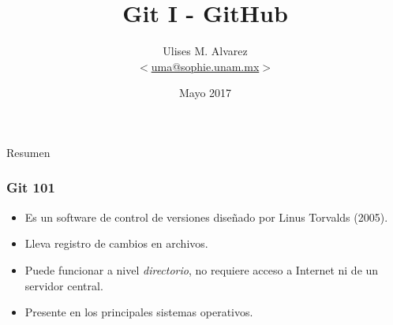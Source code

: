 \documentclass{beamer}
\title{Git I - GitHub}
\date{Mayo 2017}
\author{Ulises M. Alvarez\\ %
   $<$\href{mailto:uma@sophie.unam.mx}%
   {uma@sophie.unam.mx}$>$
}
\institute{Sophie UNAM}
\begin{document}
\maketitle



\begin{frame}[standout]
  Resumen
\end{frame}

\begin{frame}
  \frametitle{Git 101}
  \begin{itemize}
  \item Es un software de control de versiones diseñado por Linus
    Torvalds (2005).
  \item Lleva registro de cambios en archivos.
  \item Puede funcionar a nivel \textit{directorio}, no requiere
    acceso a Internet ni de un servidor central.
  \item Presente en los principales sistemas operativos.
  \end{itemize}
\end{frame}





\end{document}
